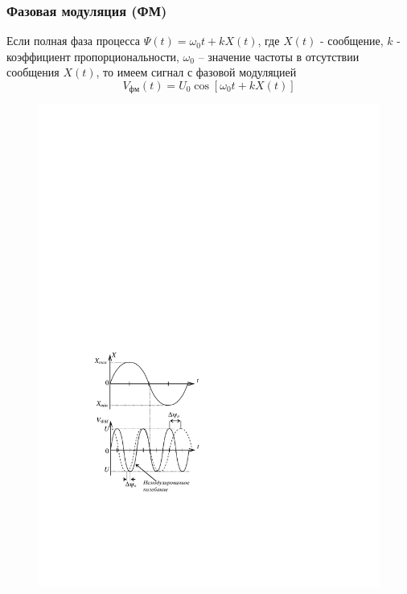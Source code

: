 \subsubsection{Фазовая модуляция (ФМ)}

Если полная фаза процесса $\Psi(t)=\omega_{0} t+k X(t)$, где $X(t)$ - сообщение, $k$ -
коэффициент	пропорциональности,	$\omega_0$ --
значение частоты в отсутствии сообщения $X(t)$, то имеем сигнал с фазовой модуляцией
\begin{equation}
	V_\text{фм}(t)=U_{0} \cos \left[\omega_{0} t+k X(t)\right]
\end{equation}
	


\begin{figure} 
	\vspace{-2ex}
	\centering
	\includegraphics[]{fig/fig2-1}
	\vspace{-1em}
	\caption{}
	\label{fig:2.1}
\end{figure}

